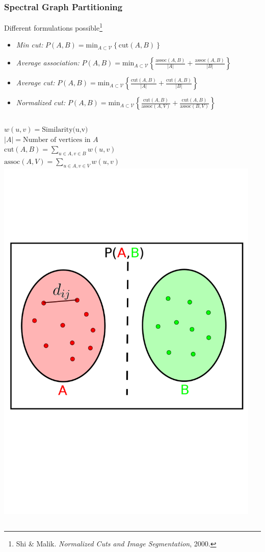 \documentclass[9pt]{beamer}
\begin{document}
\begin{frame}
\frametitle{Spectral Graph Partitioning}
\label{sec-2-2}

Different formulations possible\footnote{Shi \& Malik. \emph{Normalized Cuts and Image Segmentation}, 2000.
 }
\begin{itemize}
\item \emph{Min cut:} $P(A,B) = \text{min}_{A \subset \mathcal{V}} \left \lbrace \text{cut}(A,B) \right \rbrace$
\item \emph{Average association:} $P(A,B) = \text{min}_{A \subset \mathcal{V}} \left \lbrace \frac{\text{assoc}(A,B)}{| A |} + \frac{\text{assoc}(A,B)}{| B |} \right \rbrace$
\item \emph{Average cut:} $P(A,B) = \text{min}_{A \subset \mathcal{V}} \left \lbrace \frac{\text{cut}(A,B)}{| A |} + \frac{\text{cut}(A,B)}{| B |} \right \rbrace$
\item \emph{Normalized cut:} $P(A,B) = \text{min}_{A \subset \mathcal{V}} \left \lbrace \frac{\text{cut}(A,B)}{\text{assoc}(A,V)} + \frac{\text{cut}(A,B)}{\text{assoc}(B,V)} \right \rbrace$
\end{itemize}
\vspace{-1.0cm}
\begin{columns}[c]
    $w(u,v) = \text{Similarity(u,v)}$ \\
    $|A| = \text{Number of vertices in }A$ \\
    $\text{cut}(A,B) = \sum_{u \in A,v \in B} w(u,v)$ \\ 
    $\text{assoc}(A,V) = \sum_{u \in A, v \in V} w(u,v)$
    \centering
    \includegraphics[width=0.95\textwidth]{GraphPartition.png}

\end{columns}
\end{frame}
\end{document}
